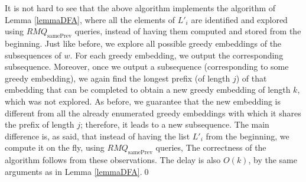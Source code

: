 \documentclass[10pt,a4paper]{amsart}
\makeatletter
\DeclareMathOperator{\prevArray}{samePrev}
\theoremstyle{plain}
\theoremstyle{definition}
\renewenvironment{proof}[1][\proofname]{\par
  \pushQED{}%
  \normalfont \topsep6\p@\@plus6\p@\relax
  \trivlist
  \item[\hskip\labelsep\itshape #1\@addpunct{.}]\ignorespaces
}{%
  \popQED\endtrivlist\@endpefalse
}
\makeatother
\begin{document}
\begin{proof}
It is not hard to see that the above algorithm implements the algorithm of Lemma \ref{lemmaDFA}, where all the elements of $L'_i$ are identified and explored using $RMQ_{\prevArray}$ queries, instead of having them computed and stored from the beginning. Just like before, we explore all possible greedy embeddings of the subsequences of $w$. For each greedy embedding, we output the corresponding subsequence. Moreover, once we output a subsequence (corresponding to some greedy embedding), we again find the longest prefix (of length $j$) of that embedding that can be completed to obtain a new greedy embedding of length $k$, which was not explored. As before, we guarantee that the new embedding is different from all the already enumerated greedy embeddings with which it shares the prefix of length $j$; therefore, it leads to a new subsequence. The main difference is, as said, that instead of having the list $L'_i$ from the beginning, we compute it on the fly, using $RMQ_{\prevArray}$ queries,
The correctness of the algorithm follows from these observations. The delay is also $O(k)$, by the same arguments as in Lemma \ref{lemmaDFA}.\qed
\end{proof}
\end{document}
